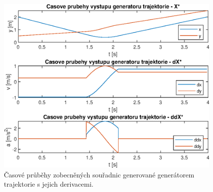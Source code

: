 \documentclass{article}
\begin{document}
				\begin{figure}[H]
					\centering
					\includegraphics[width=\textwidth]{./Graphics/4_Graphics/GEN_vystup.eps}
					\caption{Časové průběhy zobecněných souřadnic generované generátorem trajektorie s jejich derivacemi.}
					\label{graph:4_Gen_vystup}
				\end{figure}
			
\end{document}
